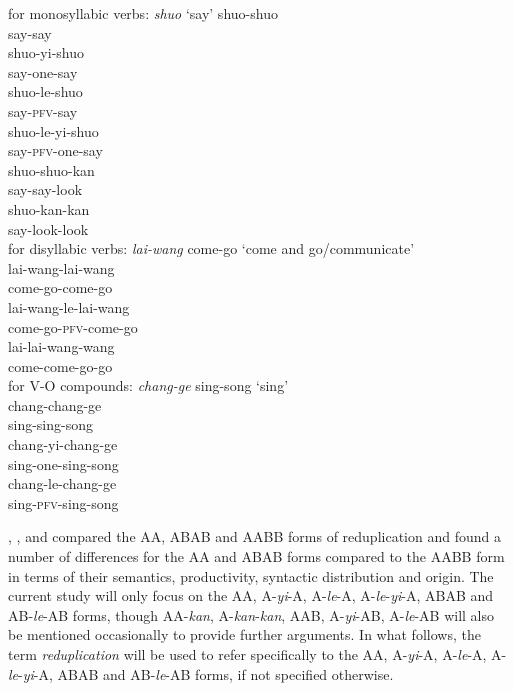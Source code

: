\documentclass[11pt,a4paper,fleqn,draft]{article}
\begin{document}
\ea\label{ex:redup-forms}
	\ea for monosyllabic verbs: \emph{shuo} `say'
		\ea \gll shuo-shuo\\
		say-say\\
		\ex \gll shuo-yi-shuo\\
		say-one-say\\
		\ex \gll shuo-le-shuo\\
		say-\textsc{pfv}-say\\
		\ex \gll shuo-le-yi-shuo\\
		say-\textsc{pfv}-one-say\\
		\ex \gll shuo-shuo-kan\\
		say-say-look\\
		\ex \gll shuo-kan-kan\\
		 say-look-look\\
		\z
	\ex for disyllabic verbs: \emph{lai-wang} come-go `come and go/communicate'\\
		\ea \gll lai-wang-lai-wang\\
		come-go-come-go\\ 
		\ex \gll lai-wang-le-lai-wang\\
		come-go-\textsc{pfv}-come-go\\ 
		\ex \gll lai-lai-wang-wang\\
		come-come-go-go\\ 
		\z
	\ex\label{ex:forms-VO} for V-O compounds: \emph{chang-ge} sing-song `sing'\\
		\ea \gll chang-chang-ge\\
		sing-sing-song\\ 
		\ex \gll chang-yi-chang-ge\\
		sing-one-sing-song\\ 
		\ex \gll chang-le-chang-ge\\
		sing-\textsc{pfv}-sing-song\\ 
		\z
	\z
\z



\citet{Arcodiaetal2014}, \citet{Fan1964}, \citet{MelloniBasciano2018} and \citet{Xie2020} compared the AA, ABAB and AABB forms of reduplication 
and found a number of differences for the AA and ABAB forms compared to the AABB form in terms of their semantics, productivity, syntactic distribution and origin. 
The current study will only focus on the AA, A-\emph{yi}-A, A-\emph{le}-A, A-\emph{le}-\emph{yi}-A, ABAB and AB-\emph{le}-AB forms, though 
AA-\emph{kan}, A-\emph{kan}-\emph{kan}, AAB, A-\emph{yi}-AB, A-\emph{le}-AB will also be mentioned occasionally to provide further arguments.
In what follows, the term \emph{reduplication} will be used to refer specifically to the AA, A-\emph{yi}-A, A-\emph{le}-A, A-\emph{le}-\emph{yi}-A, ABAB and AB-\emph{le}-AB forms, if not specified otherwise.
\end{document}
